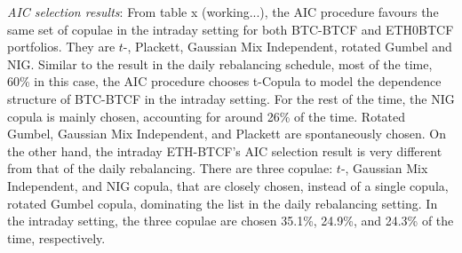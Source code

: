\documentclass[11pt,a4paper,english]{article}
\begin{document}
\textit{AIC selection results}: From table x (working...), the AIC procedure favours the same set of copulae in the intraday setting for both BTC-BTCF and ETH0BTCF portfolios.
They are $t$-, Plackett, Gaussian Mix Independent, rotated Gumbel and NIG.
Similar to the result in the daily rebalancing schedule, most of the time, 60\% in this case,
the AIC procedure chooses t-Copula to model the dependence structure of BTC-BTCF in the intraday setting.
For the rest of the time, the NIG copula is mainly chosen, accounting for around 26\% of the time.
Rotated Gumbel, Gaussian Mix Independent, and Plackett are spontaneously chosen.
On the other hand, the intraday ETH-BTCF’s AIC selection result is very different from that of the daily rebalancing.
There are three copulae: $t$-, Gaussian Mix Independent, and NIG copula, that are closely chosen, instead of a single copula, rotated Gumbel copula, dominating the list in the daily rebalancing setting.
In the intraday setting, the three copulae are chosen 35.1\%, 24.9\%, and 24.3\% of the time, respectively.
\end{document}
